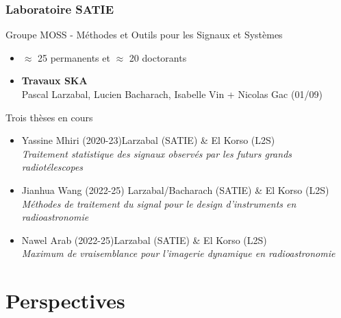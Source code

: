 \documentclass[usenames,dvipsnames]{beamer}
\begin{document}
\begin{frame}
  \frametitle{Laboratoire SATIE}
  \vfill %
  \vfill
  \begin{block}{Groupe MOSS - Méthodes et Outils pour les Signaux et Systèmes}
    \begin{itemize}
  \item  \(\approx \) 25 permanents et \(\approx\) 20 doctorants
  \item \textbf{Travaux SKA} \\
 \vspace{0.1cm}
  Pascal Larzabal, Lucien Bacharach, Isabelle Vin + Nicolas Gac \scriptsize{(01/09)}
\end{itemize}
  \end{block}
  \vfill

  \begin{block}{Trois thèses en cours}
    \begin{itemize}
     \item \normalsize{Yassine Mhiri (2020-23)}\hfill \scriptsize{Larzabal (SATIE) \& El Korso (L2S)} \\
    \small{\textit{Traitement statistique des signaux observés par les futurs grands radiotélescopes}}\\
    \item \normalsize{Jianhua Wang (2022-25)} \hfill \scriptsize{Larzabal/Bacharach (SATIE) \& El Korso (L2S) } \\
    \small{\textit{Méthodes de traitement du signal pour le design d'instruments en radioastronomie}}\\
    \item \normalsize{Nawel Arab (2022-25)}\hfill \scriptsize{Larzabal (SATIE) \& El Korso (L2S)} \\
    \small{\textit{Maximum de vraisemblance pour l’imagerie dynamique en radioastronomie}}\\
    \end{itemize}
  \end{block}
  
\end{frame}



\section{Perspectives}
\end{document}
